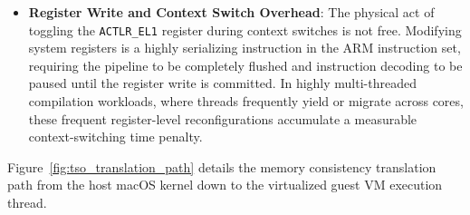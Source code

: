 \begin{itemize}
    \item \textbf{Register Write and Context Switch Overhead}: The physical act of toggling the \texttt{ACTLR\_EL1} register during context switches is not free. Modifying system registers is a highly serializing instruction in the ARM instruction set, requiring the pipeline to be completely flushed and instruction decoding to be paused until the register write is committed. In highly multi-threaded compilation workloads, where threads frequently yield or migrate across cores, these frequent register-level reconfigurations accumulate a measurable context-switching time penalty.
\end{itemize}

Figure~\ref{fig:tso_translation_path} details the memory consistency translation path from the host macOS kernel down to the virtualized guest VM execution thread.

